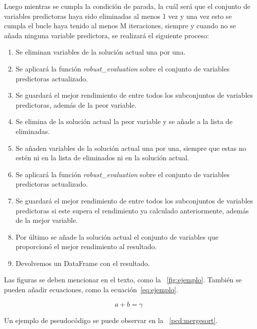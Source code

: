 \documentclass[conference,a4paper]{IEEEtran}
\begin{document}
  Luego mientras se cumpla la condición de parada, la cuál será que el conjunto de variables predictoras haya sido 
  eliminadas al menos 1 vez y una vez esto se cumpla el bucle haya tenido al menos M iteraciones, siempre y cuando 
  no se añada ninguna variable predictora, se realizará el siguiente proceso:
  \begin{enumerate}
    \item Se eliminan variables de la solución actual una por una.
    \item Se aplicará la función \emph{robust\_evaluation} sobre el conjunto de variables predictoras actualizado.
    \item Se guardará el mejor rendimiento de entre todos los subconjuntos de variables predictoras, además de la peor variable.
    \item Se elimina de la solución actual la peor variable y se añade a la lista de eliminadas.
    \item Se añaden variables de la solución actual una por una, siempre que estas no estén ni en la lista de eliminados ni en la solución actual.
    \item Se aplicará la función \emph{robust\_evaluation} sobre el conjunto de variables predictoras actualizado.
    \item Se guardará el mejor rendimiento de entre todos los subconjuntos de variables predictoras si este supera el rendimiento ya calculado anteriormente, además de la mejor variable.
    \item Por último se añade la solución actual el conjunto de variables que proporcionó el mejor rendimiento al resultado.
    \item Devolvemos un DataFrame con el resultado.
  \end{enumerate}

Las figuras se deben mencionar en el texto, como la
\figurename~\ref{fig:ejemplo}. También se pueden añadir ecuaciones, como la
ecuación~\eqref{eq:ejemplo}.

\begin{equation}
  \label{eq:ejemplo}
  a + b = \gamma
\end{equation}

Un ejemplo de pseudocódigo se puede observar en la
\figurename~\ref{pcd:mergesort}.
\end{document}
